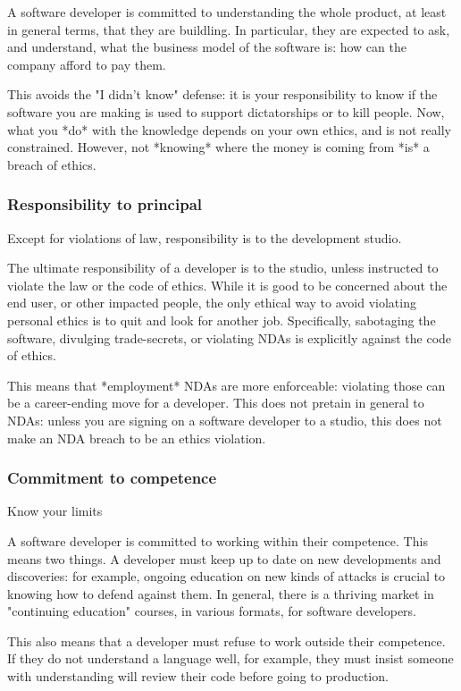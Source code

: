A software developer is committed to understanding the whole product,
at least in general terms,
that they are buildling.
In particular,
they are expected to ask,
and understand,
what the business model of the software is:
how can the company afford to pay them.

This avoids the
"I didn't know"
defense:
it is your responsibility to know if the software you are making
is used to support dictatorships or to kill people.
Now,
what you
*do*
with the knowledge depends on your own ethics,
and is not really constrained.
However,
not
*knowing*
where the money is coming from
*is*
a breach of ethics.

\begin{frame}[fragile]
\frametitle{Responsibility to principal}

Except for violations of law,
responsibility is to the development studio.

\end{frame}

The ultimate responsibility of a developer is to the studio,
unless instructed to violate the law or the code of ethics.
While it is good to be concerned about the end user,
or other impacted people,
the only ethical way to avoid violating personal ethics is to
quit and look for another job.
Specifically,
sabotaging the software, divulging trade-secrets,
or violating NDAs is explicitly against the code of ethics.

This means that *employment* NDAs are more enforceable:
violating those can be a career-ending move for a developer.
This does not pretain in general to NDAs:
unless you are signing on a software developer to a studio,
this does not make an NDA breach to be an ethics violation.

\begin{frame}[fragile]
\frametitle{Commitment to competence}

Know your limits

\end{frame}

A software developer is committed to working within their competence.
This means two things.
A developer must keep up to date on new developments and discoveries:
for example,
ongoing education on new kinds of attacks is crucial to knowing how to defend
against them.
In general,
there is a thriving market in
"continuing education"
courses,
in various formats,
for software developers.

This also means that a developer must refuse to work outside their competence.
If they do not understand a language well,
for example,
they must insist someone with understanding will review their code before
going to production.

